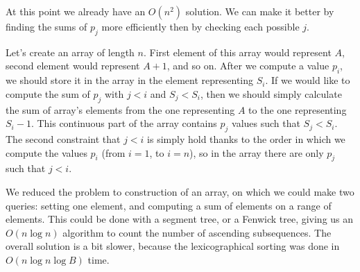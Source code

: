 At this point we already have an $O(n^2)$ solution.
We can make it better by finding the sums of $p_j$ more efficiently then by checking each possible $j$.

Let's create an array of length $n$.
First element of this array would represent $A$, second element would represent $A+1$, and so on.
After we compute a value $p_i$, we should store it in the array in the element representing $S_i$.
If we would like to compute the sum of $p_j$ with $j < i$ and $S_j < S_i$,
	then we should simply calculate the sum of array's elements from the one representing $A$ to the one representing $S_i - 1$.
This continuous part of the array contains $p_j$ values such that $S_j < S_i$.
The second constraint that $j < i$ is simply hold thanks to the order in which we compute the values $p_i$
	(from $i=1$, to $i=n$), so in the array there are only $p_j$ such that $j < i$.

We reduced the problem to construction of an array, on which we could make two queries:
	setting one element, and computing a sum of elements on a range of elements.
This could be done with a segment tree, or a Fenwick tree, giving us an $O(n\log n)$ algorithm
	to count the number of ascending subsequences.
The overall solution is a bit slower, because the lexicographical sorting was done in $O(n\log n \log B)$ time.
